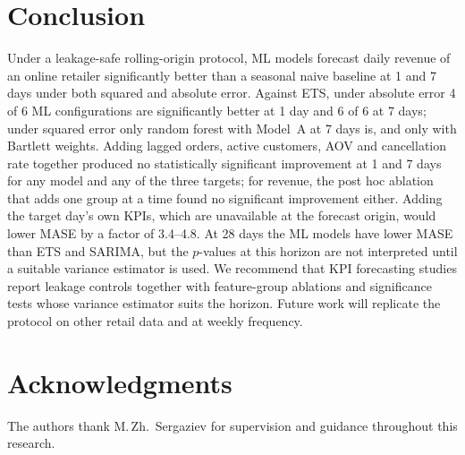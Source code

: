 \documentclass[conference]{IEEEtran}
\begin{document}
\section{Conclusion}
Under a leakage-safe rolling-origin protocol, ML models forecast daily revenue of an online retailer
significantly better than a seasonal naive baseline at 1 and 7 days under both squared and absolute error.
Against ETS, under absolute error 4 of 6 ML configurations are significantly better at 1 day and 6 of 6 at
7 days; under squared error only random forest with Model~A at 7 days is, and only with Bartlett weights.
Adding lagged
orders, active customers, AOV and cancellation rate together produced no statistically significant improvement
at 1 and 7 days for any model and any of the three targets; for revenue, the post hoc ablation that adds one
group at a time found no significant improvement either. Adding the target day's own KPIs, which are
unavailable at the forecast origin, would lower MASE by a factor of 3.4--4.8. At 28 days the ML models have lower
MASE than ETS and SARIMA, but the $p$-values at this horizon are not interpreted until a suitable variance
estimator is used. We recommend that KPI forecasting studies report leakage controls together with feature-group
ablations and significance tests whose variance estimator suits the horizon. Future work will replicate the
protocol on other retail data and at weekly frequency.

\section*{Acknowledgments}
The authors thank M.\,Zh.\ Sergaziev for supervision and guidance throughout this research.



\end{document}
